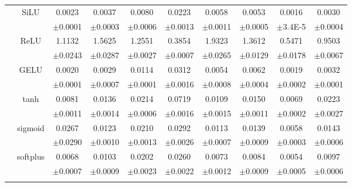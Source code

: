 \documentclass{article}
\begin{document}
\begin{longtable}[h!]{cccccccccc}
        \hline\rule{0pt}{2.3ex}

        \multirow{14}{*}{\textsf{MAE\textsubscript{ef}}} 
        & \multirow{2}{*}{SiLU}
        & {0.0023} & {0.0037} & {0.0080} & {0.0223} & {0.0058} & {0.0053} & {0.0016} & {0.0030} \\
        && \scriptsize {$\pm$0.0001} & \scriptsize {$\pm$0.0003} & \scriptsize {$\pm$0.0006} & \scriptsize {$\pm$0.0013} & \scriptsize {$\pm$0.0011} & \scriptsize {$\pm$0.0005} & \tiny{$\pm$3.4E-5} & \scriptsize {$\pm$0.0004}\\
        \cline{3-10}\rule{0pt}{2.3ex}

        & \multirow{2}{*}{ReLU}
        &1.1132 & 1.5625 & 1.2551 & 0.3854 & 1.9323 & 1.3612 & 0.5471 & 0.9503\\
        &&\scriptsize $\pm$0.0243&\scriptsize$\pm$0.0287&\scriptsize$\pm$0.0027&\scriptsize$\pm$0.0007&\scriptsize$\pm$0.0265&\scriptsize$\pm$0.0129&\scriptsize$\pm$0.0178&\scriptsize$\pm$0.0067\\
        \cline{3-10}\rule{0pt}{2.3ex}

        & \multirow{2}{*}{GELU}
        &0.0020 & 0.0029 & 0.0114 & 0.0312 & 0.0054 & 0.0062 & 0.0019 & 0.0032\\
        &&\scriptsize $\pm$0.0001&\scriptsize$\pm$0.0007&\scriptsize$\pm$0.0001&\scriptsize$\pm$0.0016&\scriptsize$\pm$0.0008&\scriptsize$\pm$0.0004&\scriptsize$\pm$0.0002&\scriptsize$\pm$0.0001\\
        \cline{3-10}\rule{0pt}{2.3ex}

        & \multirow{2}{*}{tanh}
        &0.0081 & 0.0136 & 0.0214 & 0.0719 & 0.0109 & 0.0150 & 0.0069 & 0.0223\\
        &&\scriptsize $\pm$0.0011&\scriptsize$\pm$0.0014&\scriptsize$\pm$0.0006&\scriptsize$\pm$0.0016&\scriptsize$\pm$0.0015&\scriptsize$\pm$0.0011&\scriptsize$\pm$0.0002&\scriptsize$\pm$0.0027\\
        \cline{3-10}\rule{0pt}{2.3ex}

        & \multirow{2}{*}{sigmoid}
        &0.0267 & 0.0123 & 0.0210 & 0.0292 & 0.0113 & 0.0139 & 0.0058 & 0.0143\\
        &&\scriptsize $\pm$0.0290&\scriptsize$\pm$0.0010&\scriptsize$\pm$0.0013&\scriptsize$\pm$0.0026&\scriptsize$\pm$0.0007&\scriptsize$\pm$0.0009&\scriptsize$\pm$0.0003&\scriptsize$\pm$0.0006\\
        \cline{3-10}\rule{0pt}{2.3ex}

        & \multirow{2}{*}{softplus}
        &0.0068 & 0.0103 & 0.0202 & 0.0260 & 0.0073 & 0.0084 & 0.0054 & 0.0097\\
        &&\scriptsize $\pm$0.0007&\scriptsize$\pm$0.0009&\scriptsize$\pm$0.0023&\scriptsize$\pm$0.0022&\scriptsize$\pm$0.0012&\scriptsize$\pm$0.0009&\scriptsize$\pm$0.0005&\scriptsize$\pm$0.0006\\
        \cline{3-10}\rule{0pt}{2.3ex}


\end{longtable}
\end{document}

